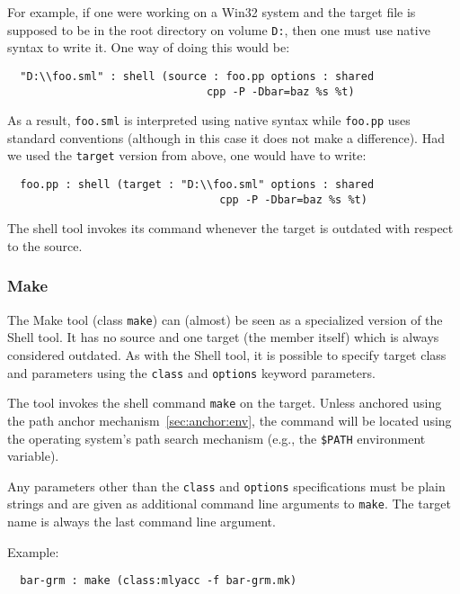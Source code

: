 \documentclass[titlepage,letterpaper]{article}
\begin{document}
For example, if one were working on a Win32 system and the target file
is supposed to be in the root directory on volume {\tt D:},
then one must use native syntax to write it.  One way of doing this
would be:

\begin{verbatim}
  "D:\\foo.sml" : shell (source : foo.pp options : shared
                               cpp -P -Dbar=baz %s %t)
\end{verbatim}

\noindent As a result, {\tt foo.sml} is interpreted using native
syntax while {\tt foo.pp} uses standard conventions (although in this
case it does not make a difference).  Had we used the {\tt target}
version from above, one would have to write:

\begin{verbatim}
  foo.pp : shell (target : "D:\\foo.sml" options : shared
                                 cpp -P -Dbar=baz %s %t)
\end{verbatim}

The shell tool invokes its command whenever the target is outdated
with respect to the source.

\subsubsection{Make}

The Make tool (class {\tt make}) can (almost) be seen as a specialized
version of the Shell tool.  It has no source and one target (the
member itself) which is always considered outdated.  As with the Shell
tool, it is possible to specify target class and parameters using the
{\tt class} and {\tt options} keyword parameters.

The tool invokes the shell command {\tt make} on the target.  Unless
anchored using the path anchor mechanism~\ref{sec:anchor:env}, the
command will be located using the operating system's path search
mechanism (e.g., the {\tt \$PATH} environment variable).

Any parameters other than the {\tt class} and {\tt options}
specifications must be plain strings and are given as additional
command line arguments to {\tt make}.  The target name is always the
last command line argument.

Example:

\begin{verbatim}
  bar-grm : make (class:mlyacc -f bar-grm.mk)
\end{verbatim}
\end{document}
